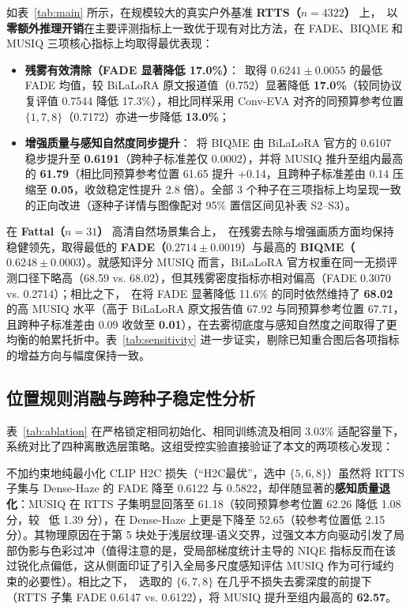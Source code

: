 \documentclass[10pt,twocolumn,letterpaper]{article}
\begin{document}
如表~\ref{tab:main} 所示，在规模较大的真实户外基准 \textbf{RTTS（$n=4322$）} 上，\method~以\textbf{零额外推理开销}在主要评测指标上一致优于现有对比方法，在 FADE、BIQME 和 MUSIQ 三项核心指标上均取得最优表现：
\begin{itemize}\setlength{\itemsep}{1pt}\setlength{\parskip}{0pt}
\item \textbf{残雾有效清除（FADE 显著降低 17.0\%）}：\method~取得 $0.6241\pm 0.0055$ 的最低 FADE 均值，较 BiLaLoRA 原文报道值（0.752）显著降低 \textbf{17.0\%}（较同协议复评值 0.7544 降低 17.3\%），相比同样采用 Conv-EVA 对齐的同预算参考位置 $\{1,7,8\}$（0.7172）亦进一步降低 \textbf{13.0\%}；
\item \textbf{增强质量与感知自然度同步提升}：\method~将 BIQME 由 BiLaLoRA 官方的 0.6107 稳步提升至 \textbf{0.6191}（跨种子标准差仅 0.0002），并将 MUSIQ 推升至组内最高的 \textbf{61.79}（相比同预算参考位置 61.65 提升 +0.14，且跨种子标准差由 0.14 压缩至 \textbf{0.05}，收敛稳定性提升 2.8 倍）。全部 3 个种子在三项指标上均呈现一致的正向改进（逐种子详情与图像配对 95\% 置信区间见补表 S2--S3）。
\end{itemize}

在 \textbf{Fattal（$n=31$）} 高清自然场景集合上，\method~在残雾去除与增强画质方面均保持稳健领先，取得最低的 \textbf{FADE（$0.2714\pm 0.0019$}）与最高的 \textbf{BIQME（$0.6248\pm 0.0003$}）。就感知评分 MUSIQ 而言，BiLaLoRA 官方权重在同一无损评测口径下略高（68.59 vs. 68.02），但其残雾密度指标亦相对偏高（FADE 0.3070 vs. 0.2714）；相比之下，\method~在将 FADE 显著降低 11.6\% 的同时依然维持了 \textbf{68.02} 的高 MUSIQ 水平（高于 BiLaLoRA 原文报告值 67.92 与同预算参考位置 67.71，且跨种子标准差由 0.09 收敛至 \textbf{0.01}），在去雾彻底度与感知自然度之间取得了更均衡的帕累托折中。表~\ref{tab:sensitivity} 进一步证实，剔除已知重合图后各项指标的增益方向与幅度保持一致。

\subsection{位置规则消融与跨种子稳定性分析}
表~\ref{tab:ablation} 在严格锁定相同初始化、相同训练流及相同 3.03\% 适配容量下，系统对比了四种离散选层策略。这组受控实验直接验证了本文的两项核心发现：

不加约束地纯最小化 CLIP H2C 损失（“H2C最优”，选中 $\{5,6,8\}$）虽然将 RTTS 子集与 Dense-Haze 的 FADE 降至 0.6122 与 0.5822，却伴随显著的\textbf{感知质量退化}：MUSIQ 在 RTTS 子集明显回落至 61.18（较同预算参考位置 62.26 降低 1.08 分，较 \method~低 1.39 分），在 Dense-Haze 上更是下降至 52.65（较参考位置低 2.15 分）。其物理原因在于第 5 块处于浅层纹理-语义交界，过强文本方向驱动引发了局部伪影与色彩过冲（值得注意的是，受局部梯度统计主导的 NIQE 指标反而在该过锐化点偏低，这从侧面印证了引入全局多尺度感知评估 MUSIQ 作为可行域约束的必要性）。相比之下，\method~选取的 $\{6,7,8\}$ 在几乎不损失去雾深度的前提下（RTTS 子集 FADE 0.6147 vs. 0.6122），将 MUSIQ 提升至组内最高的 \textbf{62.57}。
\end{document}
